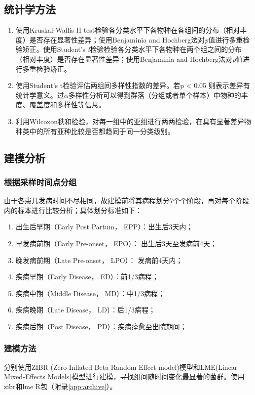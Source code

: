   \subsection{统计学方法}
  \label{统计学方法}
    \begin{enumerate}
      \item 使用Kruskal-Wallis H test检验各分类水平下各物种在各组间的分布（相对丰度）是否存在显著性差异；使用Benjaminia and Hochberg法对\textit{p}值进行多重检验矫正。使用Student’s \textit{t}检验检验各分类水平下各物种在两个组之间的分布（相对丰度）是否存在显著性差异；使用Benjaminia and Hochberg法对\textit{p}值进行多重检验矫正。
      \item 使用Student’s t检验评估两组间多样性指数的差异。若p < 0.05 则表示差异有统计学意义。过$\alpha$多样性分析可以得到群落（分组或者单个样本）中物种的丰度、覆盖度和多样性等信息。
      \item 利用Wilcoxon秩和检验，对每一组中的亚组进行两两检验，在具有显著差异物种类中的所有亚种比较是否都趋同于同一分类级别。
    \end{enumerate}

  \subsection{建模分析}
    \subsubsection{根据采样时间点分组}
    由于各患儿发病时间不尽相同，故建模前将其病程划分7个个阶段，再对每个阶段内的标本进行比较分析；具体划分标准如下：
    \begin{enumerate}
      \item 出生后早期（Early Post Partum， EPP）：出生后3天内；
      \item 早发病前期（Early Pre-onset， EPO）： 出生后3天至发病前4天；
      \item 晚发病前期（Late Pre-onset， LPO）： 发病前4天内；
      \item 疾病早期（Early Disease， ED）：前1/3病程；
      \item 疾病中期（Middle Disease， MD）：中1/3病程；
      \item 疾病晚期（Late Disease， LD）：后1/3病程；
      \item 疾病后期（Post Disease， PD）：疾病痊愈至出院期间；
    \end{enumerate}
    \subsubsection{建模方法}
    分别使用ZIBR (Zero-Inflated Beta Random Effect model)模型和LME(Linear Mixed-Effects Models)模型进行建模，寻找组间随时间变化最显著的菌群。使用zibr和lme R包（附录\ref{app:archive}）。


